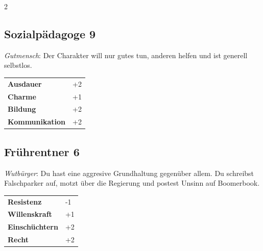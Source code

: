 \begin{multicols}{2}
\begin{tcolorbox}
    \subsection*{Sozialpädagoge \hfill \small{9 }}
    \tcblower
\textit{Gutmensch}: Der Charakter will nur gutes tun, anderen helfen und ist generell selbstlos.


\vspace{3mm}

\begin{tabular}{@{}ll@{}}
    \textbf{Ausdauer} & +2\\
    \textbf{Charme} & +1\\
    \textbf{Bildung} & +2\\
    \textbf{Kommunikation} & +2\\
\end{tabular}


\end{tcolorbox}

\begin{tcolorbox}
    \subsection*{Frührentner \hfill \small{6 }}
    \tcblower
\textit{Wutbürger}: Du hast eine aggresive Grundhaltung gegenüber allem. Du schreibst Falschparker auf, motzt über die Regierung und postest Unsinn auf Boomerbook.


\vspace{3mm}

\begin{tabular}{@{}ll@{}}
    \textbf{Resistenz} & -1\\
    \textbf{Willenskraft} & +1\\
    \textbf{Einschüchtern} & +2\\
    \textbf{Recht} & +2\\
\end{tabular}


\end{tcolorbox}


\end{multicols}
